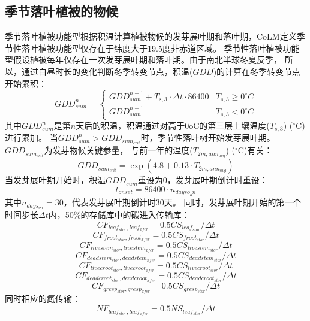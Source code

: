 \subsection{季节落叶植被的物候}\label{季节落叶植被的物候}
季节落叶植被功能型根据积温计算植被物候的发芽展叶期和落叶期，CoLM定义季节性落叶植被功能型仅存在于纬度大于19.5度非赤道区域。
季节性落叶植被功能型假设植被每年仅存在一次发芽展叶期和落叶期。由于南北半球冬夏反季，
所以，通过白昼时长的变化判断冬季转变节点，积温($GDD$)的计算在冬季转变节点开始累积\citep{white1997continental}：
\begin{equation}
GDD _{sum}^{n}=\left\{\begin{array}{ll}GDD _{sum}^{n-1}+T_{s, 3} \cdot \Delta t \cdot 86400 & T_{s, 3} \geq 0^{\circ}{C} \\ GDD _{sum}^{n-1} & T_{s, 3}<0^{\circ}{C}\end{array}\right.
\end{equation}
其中$GDD_{sum}^n$是第$n$天后的积温，积温通过对高于0oC的第三层土壤温度($T_{s,3}$) ($^{\circ}$C)进行累加。
当$GDD_{sum}^n>{GDD}_{sum_{crit}}$时，季节性落叶树开始发芽展叶期。${GDD}_{sum_{crit}}$为发芽物候关键参量，
与前一年的温度($T_{2m,ann_{avg}}$) ($^{\circ}$C)有关：
\begin{equation}
GDD _{sum_{c r i t}}=\exp \left(4.8+0.13 \cdot T_{2 m, ann_{avg}}\right)
\end{equation}
当发芽展叶期开始时，积温${GDD}_{sum}$重设为0，发芽展叶期倒计时重设：
\begin{equation}
t_{o n s e t}=86400 \cdot n_{ {dayso }_{o} n}
\end{equation}
其中$n_{days_{on}}=30$，代表发芽展叶期倒计时30天。
同时，发芽展叶期开始的第一个时间步长$\Delta t$内，50\%的存储库中的碳进入传输库：
\begin{equation}
  CF_{leaf_{stor},leaf_{xfer}}=0.5 CS_{leaf_{stor}}/\Delta t
\end{equation}
\begin{equation}
  CF_{froot_{stor},froot_{xfer}}=0.5  CS_{froot_{stor}}/\Delta t
\end{equation}
\begin{equation}
  CF_{livestem_{stor},livestem_{xfer}}=0.5  CS_{livestem_{stor}}/\Delta t
\end{equation}
\begin{equation}
  CF_{deadstem_{stor},deadstem_{xfer}}=0.5  CS_{deadstem_{stor}}/\Delta t
\end{equation}
\begin{equation}
  CF_{livecroot_{stor},livecroot_{xfer}}=0.5  CS_{livecroot_{stor}}/\Delta t
\end{equation}
\begin{equation}
  CF_{deadcroot_{stor},deadcroot_{xfer}}=0.5 CS_{deadcroot_{stor}}/\Delta t
\end{equation}
\begin{equation}
  CF_{gresp_{stor},gresp_{xfer}}=0.5  CS_{gresp_{stor}}/\Delta t
\end{equation}
同时相应的氮传输：
\begin{equation}
NF_{leaf_{stor},leaf_{xfer}}=0.5  NS_{leaf_{stor}}/\Delta t
\end{equation}

